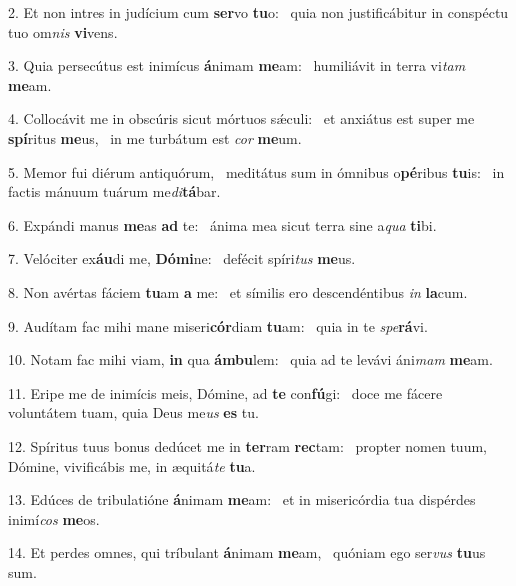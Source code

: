 2. Et non intres in judícium cum \textbf{ser}vo \textbf{tu}o: \ast\  quia non justificábitur in conspéctu tuo om\textit{nis} \textbf{vi}vens.\

3. Quia persecútus est inimícus \textbf{á}nimam \textbf{me}am: \ast\  humiliávit in terra vi\textit{tam} \textbf{me}am.\

4. Collocávit me in obscúris sicut mórtuos sǽculi: \dag\  et anxiátus est super me \textbf{spí}ritus \textbf{me}us, \ast\  in me turbátum est \textit{cor} \textbf{me}um.\

5. Memor fui diérum antiquórum, \dag\  meditátus sum in ómnibus o\textbf{pé}ribus \textbf{tu}is: \ast\  in factis mánuum tuárum me\textit{di}\textbf{tá}bar.\

6. Expándi manus \textbf{me}as \textbf{ad} te: \ast\  ánima mea sicut terra sine a\textit{qua} \textbf{ti}bi.\

7. Velóciter ex\textbf{áu}di me, \textbf{Dó}\textbf{mi}ne: \ast\  defécit spíri\textit{tus} \textbf{me}us.\

8. Non avértas fáciem \textbf{tu}am \textbf{a} me: \ast\  et símilis ero descendéntibus \textit{in} \textbf{la}cum.\

9. Audítam fac mihi mane miseri\textbf{cór}diam \textbf{tu}am: \ast\  quia in te \textit{spe}\textbf{rá}vi.\

10. Notam fac mihi viam, \textbf{in} qua \textbf{ám}\textbf{bu}lem: \ast\  quia ad te levávi áni\textit{mam} \textbf{me}am.\

11. Eripe me de inimícis meis, Dómine, ad \textbf{te} con\textbf{fú}gi: \ast\  doce me fácere voluntátem tuam, quia Deus me\textit{us} \textbf{es} tu.\

12. Spíritus tuus bonus dedúcet me in \textbf{ter}ram \textbf{rec}tam: \ast\  propter nomen tuum, Dómine, vivificábis me, in æquitá\textit{te} \textbf{tu}a.\

13. Edúces de tribulatióne \textbf{á}nimam \textbf{me}am: \ast\  et in misericórdia tua dispérdes inimí\textit{cos} \textbf{me}os.\

14. Et perdes omnes, qui tríbulant \textbf{á}nimam \textbf{me}am, \ast\  quóniam ego ser\textit{vus} \textbf{tu}us sum.\

